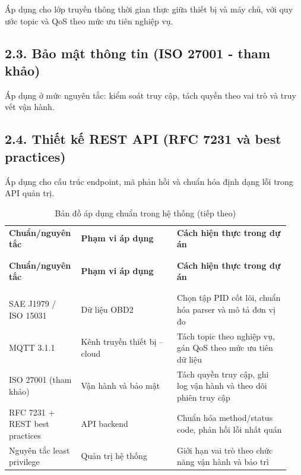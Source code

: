 \documentclass[a4paper]{extarticle}
\newcommand{\thesissettableid}[2]{%
  \renewcommand{\thetable}{#1}%
  \renewcommand{\theHtable}{#2}%
}
\begin{document}
Áp dụng cho lớp truyền thông thời gian thực giữa thiết bị và máy chủ, với quy ước topic và QoS theo mức ưu tiên nghiệp vụ.

\subsection{2.3. Bảo mật thông tin (ISO 27001 - tham khảo)}

Áp dụng ở mức nguyên tắc: kiểm soát truy cập, tách quyền theo vai trò và truy vết vận hành.

\subsection{2.4. Thiết kế REST API (RFC 7231 và best practices)}

Áp dụng cho cấu trúc endpoint, mã phản hồi và chuẩn hóa định dạng lỗi trong API quản trị.

{\thesissettableid{PL-2.1}{tab-condensed-app2-standard-mapping}
\def\LTcaptype{table}
\begin{longtable}{|L{0.220\linewidth}|L{0.330\linewidth}|L{0.390\linewidth}|}
\caption{Bản đồ áp dụng chuẩn trong hệ thống}\label{tab:condensed-app2-standard-mapping}\\
\hline \textbf{Chuẩn/nguyên tắc} & \textbf{Phạm vi áp dụng} & \textbf{Cách hiện thực trong dự án} \\
\\\hline
\endfirsthead
\caption[]{Bản đồ áp dụng chuẩn trong hệ thống (tiếp theo)}\\
\hline \textbf{Chuẩn/nguyên tắc} & \textbf{Phạm vi áp dụng} & \textbf{Cách hiện thực trong dự án} \\
\\\hline
\endhead
\\\hline
\endfoot
\endlastfoot
SAE J1979 / ISO 15031 & Dữ liệu OBD2 & Chọn tập PID cốt lõi, chuẩn hóa parser và mô tả đơn vị đo \\\hline
MQTT 3.1.1 & Kênh truyền thiết bị -- cloud & Tách topic theo nghiệp vụ, gán QoS theo mức ưu tiên dữ liệu \\\hline
ISO 27001 (tham khảo) & Vận hành và bảo mật & Tách quyền truy cập, ghi log vận hành và theo dõi phiên truy cập \\\hline
RFC 7231 + REST best practices & API backend & Chuẩn hóa method/status code, phản hồi lỗi nhất quán \\\hline
Nguyên tắc least privilege & Quản trị hệ thống & Giới hạn vai trò theo chức năng vận hành và bảo trì \\\hline
\end{longtable}
}
\end{document}
